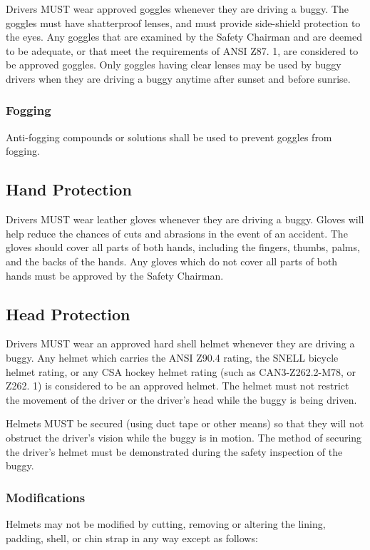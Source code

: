 \documentclass[openany]{book}
\begin{document}
Drivers MUST wear approved goggles whenever they are driving a buggy. The goggles must have shatterproof lenses, and must provide side-shield protection to the eyes. Any goggles that are examined by the Safety Chairman and are deemed to be adequate, or that meet the requirements of ANSI Z87. 1, are considered to be approved goggles. Only goggles having clear lenses may be used by buggy drivers when they are driving a buggy anytime after sunset and before sunrise.

\subsubsection{Fogging}
Anti-fogging compounds or solutions shall be used to prevent goggles from fogging.

\subsection{Hand Protection}

Drivers MUST wear leather gloves whenever they are driving a buggy. Gloves will help reduce the chances of cuts and abrasions in the event of an accident. The gloves should cover all parts of both hands, including the fingers, thumbs, palms, and the backs of the hands. Any gloves which do not cover all parts of both hands must be approved by the Safety Chairman.

\subsection{Head Protection}

Drivers MUST wear an approved hard shell helmet whenever they are driving a buggy. Any helmet which carries the ANSI Z90.4 rating, the SNELL bicycle helmet rating, or any CSA hockey helmet rating (such as CAN3-Z262.2-M78, or Z262. 1) is considered to be an approved helmet. The helmet must not restrict the movement of the driver or the driver's head while the buggy is being driven.

Helmets MUST be secured (using duct tape or other means) so that they will not obstruct the driver's vision while the buggy is in motion. The method of securing the driver's helmet must be demonstrated during the safety inspection of the buggy.

\subsubsection{Modifications}
Helmets may not be modified by cutting, removing or altering the lining, padding, shell, or chin strap in any way except as follows:
\end{document}
